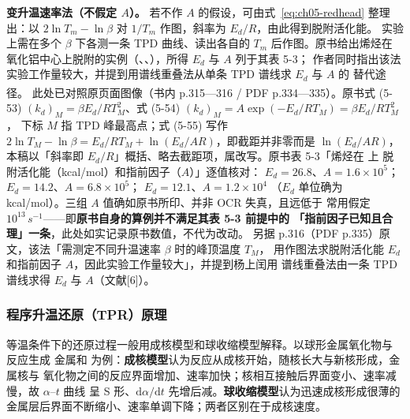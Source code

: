 \begin{measure}
\textbf{变升温速率法（不假定 $A$）。} 若不作 $A$ 的假设，可由式~\eqref{eq:ch05-redhead}
整理出：以 $2\ln T_m - \ln\beta$ 对 $1/T_m$ 作图，斜率为 $E_d/R$，由此得到脱附活化能。
实验上需在多个 $\beta$ 下各测一条 TPD 曲线、读出各自的 $T_m$ 后作图。原书给出烯烃在
氧化铝中心上脱附的实例（、、），所得 $E_d$ 与 $A$ 列于其表 5-3；
作者同时指出该法实验工作量较大，并提到用谱线重叠法从单条 TPD 谱线求 $E_d$ 与 $A$ 的
替代途径\textsuperscript{}。
此处已对照原页面图像（书内 p.315—316 / PDF p.334—335）。原书式
(5-53) $(k_d)_M=\beta E_d/RT_M^2$、式 (5-54) $(k_d)_M=A\exp(-E_d/RT_M)=\beta E_d/RT_M^2$，
下标 $M$ 指 TPD 峰最高点；式 (5-55) 写作
$2\ln T_M-\ln\beta=E_d/RT_M+\ln(E_d/AR)$，即截距并非零而是 $\ln(E_d/AR)$，
本稿以「斜率即 $E_d/R$」概括、略去截距项，属改写。原书表 5-3「烯烃在  上
脱附活化能（kcal/mol）和指前因子（$A$）」逐值核对： $E_d=26.8$、$A=1.6\times10^5$；
 $E_d=14.2$、$A=6.8\times10^5$； $E_d=12.1$、$A=1.2\times10^4$
（$E_d$ 单位确为 kcal/mol）。三组 $A$ 值确如原书所印、并非 OCR 失真，且远低于
常用假定 $10^{13}\,\si{s^{-1}}$——即\textbf{原书自身的算例并不满足其表 5-3 前提中的
「指前因子已知且合理」一条}，此处如实记录原书数值，不代为改动。
另据 p.316（PDF p.335）原文，该法「需测定不同升温速率 $\beta$ 时的峰顶温度 $T_M$，
用作图法求脱附活化能 $E_d$ 和指前因子 $A$，因此实验工作量较大」，并提到杨上闰用
谱线重叠法由一条 TPD 谱线求得 $E_d$ 与 $A$（文献[6]）。
\end{measure}

\subsubsection{程序升温还原（TPR）原理}

等温条件下的还原过程一般用成核模型和球收缩模型解释。以球形金属氧化物与  反应生成
金属和  为例：\textbf{成核模型}认为反应从成核开始，随核长大与新核形成，金属核与
氧化物之间的反应界面增加、速率加快；核相互接触后界面变小、速率减慢，故 $\alpha$–$t$ 曲线
呈 S 形、$\mathrm{d}\alpha/\mathrm{d}t$ 先增后减。\textbf{球收缩模型}认为迅速成核形成很薄的
金属层后界面不断缩小、速率单调下降；两者区别在于成核速度。

